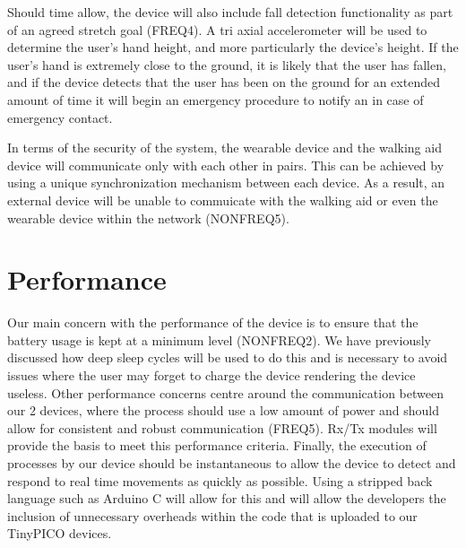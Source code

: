         Should time allow, the device will also include fall detection functionality as part of an agreed stretch goal (FREQ4). A tri axial accelerometer will be used to determine the user's hand height, and
        more particularly the device's height. If the user's hand is extremely close to the ground, it is likely that
        the user has fallen, and if the device detects that the user has been on the ground for an extended amount of time
        it will begin an emergency procedure to notify an in case of emergency contact.

        In terms of the security of the system, the wearable device and the walking aid device will communicate only with each other in pairs. This can be achieved by using a unique synchronization mechanism between each device. As a result, an external device will be unable to commuicate with the walking aid or even the wearable device within the network (NONFREQ5).

    \section{Performance}

        Our main concern with the performance of the device is to ensure that the battery usage is kept at a minimum level (NONFREQ2). We have previously discussed how deep sleep cycles will be used to do this and is necessary to avoid issues where the user may forget to charge the device rendering the device useless. Other performance concerns centre around the communication between our 2 devices, where the process should use a low amount of power and should allow for consistent and robust communication (FREQ5). Rx/Tx modules will provide the basis to meet this performance criteria. Finally, the execution of processes by our device should be instantaneous to allow the device to detect and respond to real time movements as quickly as possible. Using a stripped back language such as Arduino C will allow for this and will allow the developers the inclusion of unnecessary overheads within the code that is uploaded to our TinyPICO devices.
